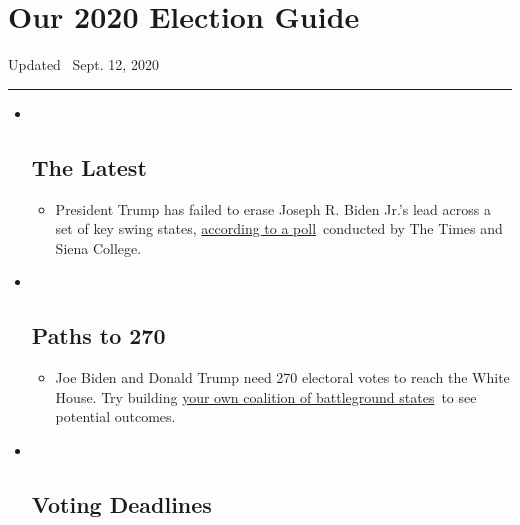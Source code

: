 \hypertarget{our-2020-election-guide}{%
\section{Our 2020 Election Guide}\label{our-2020-election-guide}}

Updated ~Sept. 12, 2020

\begin{center}\rule{0.5\linewidth}{\linethickness}\end{center}

\begin{itemize}
\item ~
  \hypertarget{the-latest}{%
  \subsection{The Latest}\label{the-latest}}

  \begin{itemize}
  \item
    President Trump has failed to erase Joseph R. Biden Jr.'s lead
    across a set of key swing states,
    \href{https://www.nytimes3xbfgragh.onion/2020/09/12/us/politics/biden-trump-poll-wisconsin-minnesota.html?action=click\&pgtype=Article\&state=default\&region=BELOW_MAIN_CONTENT\&context=storylines_guide}{according
    to a poll}~conducted by The Times and Siena College.
  \end{itemize}
\item ~
  \hypertarget{paths-to-270}{%
  \subsection{Paths to 270}\label{paths-to-270}}

  \begin{itemize}
  \item
    Joe Biden and Donald Trump need 270 electoral votes to reach the
    White House. Try building
    \href{https://www.nytimes3xbfgragh.onion/interactive/2020/us/elections/election-states-biden-trump.html?action=click\&pgtype=Article\&state=default\&region=BELOW_MAIN_CONTENT\&context=storylines_guide}{your
    own coalition of battleground states}~to see potential outcomes.
  \end{itemize}
\item ~
  \hypertarget{voting-deadlines}{%
  \subsection{Voting Deadlines}\label{voting-deadlines}}


\end{itemize}
